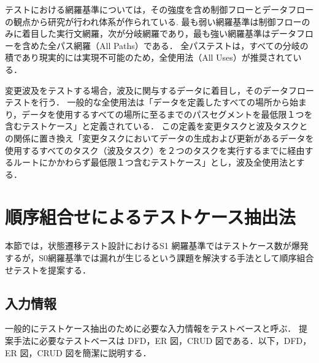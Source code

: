 テストにおける網羅基準については，その強度を含め制御フローとデータフローの観点から研究が行われ体系が作られている\cite{beiz90}.
最も弱い網羅基準は制御フローのみに着目した実行文網羅，次が分岐網羅であり，最も強い網羅基準はデータフローを含めた全パス網羅（All Paths）である．%
全パステストは，すべての分岐の積であり現実的には実現不可能のため，全使用法（All Uses）が推奨されている\cite{beiz90}．

変更波及をテストする場合，波及に関与するデータに着目し，そのデータフローテストを行う．
一般的な全使用法は「データを定義したすべての場所から始まり，データを使用するすべての場所に至るまでのパスセグメントを最低限１つを含むテストケース」と定義されている\cite{beiz90}．
この定義を変更タスクと波及タスクとの関係に置き換え「変更タスクにおいてデータの生成および更新があるデータを使用するすべてのタスク（波及タスク）を２つのタスクを実行するまでに経由するルートにかかわらず最低限１つ含むテストケース」とし，波及全使用法とする．

\newpage
\section{順序組合せによるテストケース抽出法} \label{sec:5-2}
本節では，状態遷移テスト設計におけるS1 網羅基準ではテストケース数が爆発するが，S0網羅基準では漏れが生じるという課題を解決する手法として順序組合せテストを提案する．

\subsection{入力情報}
 一般的にテストケース抽出のために必要な入力情報をテストベースと呼ぶ\cite{Demarco}．
提案手法に必要なテストベースは DFD，ER 図，CRUD 図である．以下，DFD，ER 図，CRUD 図を簡潔に説明する．

